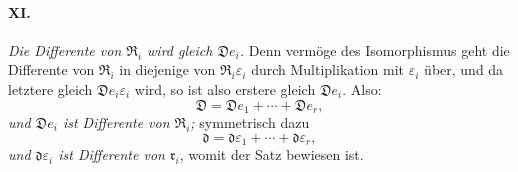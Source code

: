 \paragraph{XI.}
\emph{Die Differente von $\mathfrak R_i$ wird gleich $\mathfrak D e_i$.} Denn vermöge des Isomorphismus geht die Differente von $\mathfrak R_i$ in diejenige von $\mathfrak R_i\varepsilon_i$ durch Multiplikation mit $\varepsilon_i$ über, und da letztere gleich $\mathfrak D e_i\varepsilon_i$ wird, so ist also erstere gleich $\mathfrak D e_i$. Also:
\[
\mathfrak D=\mathfrak D e_1+\cdots+\mathfrak D e_r,
\]
\emph{und $\mathfrak D e_i$ ist Differente von $\mathfrak R_i$;} symmetrisch dazu
\[
\mathfrak d=\mathfrak d\varepsilon_1+\cdots+\mathfrak d\varepsilon_r,
\]
\emph{und $\mathfrak d\varepsilon_i$ ist Differente von $\mathfrak r_i$,} womit der Satz bewiesen ist.
